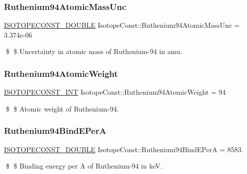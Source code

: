 \subsubsection{\texorpdfstring{Ruthenium94\+Atomic\+Mass\+Unc}{Ruthenium94AtomicMassUnc}}
{\footnotesize\ttfamily \mbox{\hyperlink{group___isotope_const-_macros_ga8f45a7272ce02c0b4c65c44636ed719a}{I\+S\+O\+T\+O\+P\+E\+C\+O\+N\+S\+T\+\_\+\+D\+O\+U\+B\+LE}} Isotope\+Const\+::\+Ruthenium94\+Atomic\+Mass\+Unc = 3.\+374e-\/06}

\$ \$ Uncertainty in atomic mass of Ruthenium-\/94 in amu. \mbox{\label{group___isotope_const-_ruthenium-_ru94_gada849ba17ad02c38a521cd3742804a36}} 
\subsubsection{\texorpdfstring{Ruthenium94\+Atomic\+Weight}{Ruthenium94AtomicWeight}}
{\footnotesize\ttfamily \mbox{\hyperlink{group___isotope_const-_macros_ga5f18360b3e99483a35c32d789e62621c}{I\+S\+O\+T\+O\+P\+E\+C\+O\+N\+S\+T\+\_\+\+I\+NT}} Isotope\+Const\+::\+Ruthenium94\+Atomic\+Weight = 94}

\$ \$ Atomic weight of Ruthenium-\/94. \mbox{\label{group___isotope_const-_ruthenium-_ru94_gaea70058f31a8941525a05b17cfa8f1f9}} 
\subsubsection{\texorpdfstring{Ruthenium94\+Bind\+E\+PerA}{Ruthenium94BindEPerA}}
{\footnotesize\ttfamily \mbox{\hyperlink{group___isotope_const-_macros_ga8f45a7272ce02c0b4c65c44636ed719a}{I\+S\+O\+T\+O\+P\+E\+C\+O\+N\+S\+T\+\_\+\+D\+O\+U\+B\+LE}} Isotope\+Const\+::\+Ruthenium94\+Bind\+E\+PerA = 8583.}

\$ \$ Binding energy per A of Ruthenium-\/94 in keV. \mbox{\label{group___isotope_const-_ruthenium-_ru94_ga01e2b2a6448dc52acd4b5a549b357566}} 
